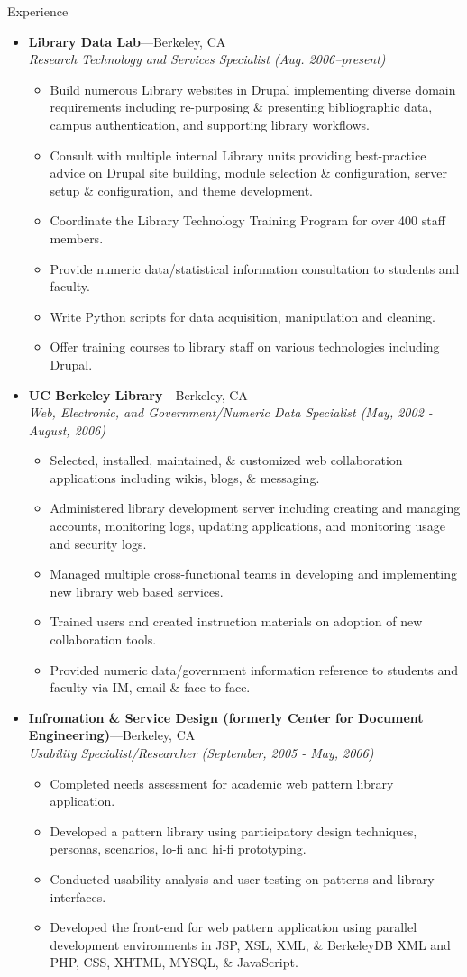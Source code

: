 \documentclass[11pt,oneside]{article}
\newenvironment{ressection}[1]{
	\vspace{4pt}
	{\fontfamily{phv}\selectfont\Large#1}
	\begin{itemize}
	\vspace{3pt}
}{
	\end{itemize}
}
\newcommand{\ressubitem}[1]{
	\vspace{-1pt}
	\item \begin{flushleft} #1 \end{flushleft}
}
\newcommand{\resbigitem}[3]{
	\vspace{-5pt}
	\item
	\textbf{#1}---#2 \\
	\textit{#3}
}
\newenvironment{ressubsec}[3]{
	\resbigitem{#1}{#2}{#3}
	\vspace{-2pt}
	\begin{itemize}
}{
	\end{itemize}
}
\begin{document}
\begin{ressection}{Experience}

	\begin{ressubsec}{Library Data Lab}{Berkeley, CA}{Research Technology and Services Specialist (Aug. 2006--present)}
		\ressubitem{Build numerous Library websites in Drupal implementing diverse domain requirements including re-purposing \&  presenting  bibliographic data, campus authentication, and supporting library workflows.}
		\ressubitem{Consult with multiple internal Library units providing best-practice advice on Drupal site building, module selection \& configuration, server setup \& configuration, and theme development.}
		\ressubitem{Coordinate the Library Technology Training Program for over 400 staff members.}
		\ressubitem{Provide numeric data/statistical information consultation to students and faculty.}
		\ressubitem{Write Python scripts for data acquisition, manipulation and cleaning.}
		\ressubitem{Offer training courses to library staff on various technologies including Drupal.}
	\end{ressubsec}

	\begin{ressubsec}{UC Berkeley Library}{Berkeley, CA}{Web, Electronic, and Government/Numeric Data Specialist (May, 2002 - August, 2006)}
		\ressubitem{Selected, installed, maintained, \& customized web collaboration applications including wikis, blogs, \& messaging.}
		\ressubitem{Administered library development server including creating and managing accounts, monitoring logs, updating applications, and monitoring usage and security logs.}
		\ressubitem{Managed multiple cross-functional teams in developing and implementing new library web based services.}
		\ressubitem{Trained users and created instruction materials on adoption of new collaboration tools.}
		\ressubitem{Provided numeric data/government information reference to students and faculty via IM, email \& face-to-face.}		
	\end{ressubsec}
	
	\begin{ressubsec}{Infromation \& Service Design (formerly Center for Document Engineering)}{Berkeley, CA}{Usability Specialist/Researcher (September, 2005 - May, 2006)}
	  \ressubitem{Completed needs assessment for academic web pattern library application.}
	  \ressubitem{Developed a pattern library using participatory design techniques, personas, scenarios, lo-fi and hi-fi prototyping.}
	  \ressubitem{Conducted usability analysis and user testing on patterns and library interfaces.}
	  \ressubitem{Developed the front-end for web pattern application using parallel development environments in JSP, XSL, XML, \& BerkeleyDB XML and PHP, CSS, XHTML, MYSQL, \& JavaScript.}
	\end{ressubsec}
\end{ressection}
\end{document}
